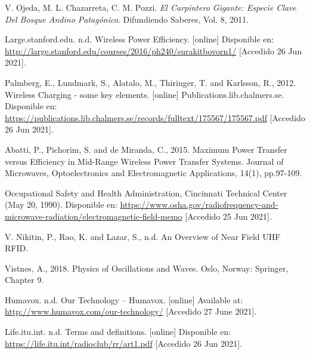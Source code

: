 %

%

\begin{flushleft}
\begin{thebibliography}{9}

V. Ojeda, M. L. Chazarreta, C. M. Pozzi. \textit{El Carpintero Gigante: Especie Clave Del Bosque Andino Patagónico}. Difundiendo Saberes, Vol. 8, 2011.

Large.stanford.edu. n.d. Wireless Power Efficiency. [online] Disponible en: \href{http://large.stanford.edu/courses/2016/ph240/surakitbovorn1/}{http://large.stanford.edu/courses/2016/ph240/surakitbovorn1/} [Accedido 26 Jun 2021].

Palmberg, E., Lundmark, S., Alatalo, M., Thiringer, T. and Karlsson, R., 2012. Wireless Charging - some key elements. [online] Publications.lib.chalmers.se. Disponible en: \href{https://publications.lib.chalmers.se/records/fulltext/175567/175567.pdf}{https://publications.lib.chalmers.se/records/fulltext/175567/175567.pdf} [Accedido 26 Jun 2021].

Abatti, P., Pichorim, S. and de Miranda, C., 2015. Maximum Power Transfer versus Efficiency in Mid-Range Wireless Power Transfer Systems. Journal of Microwaves, Optoelectronics and Electromagnetic Applications, 14(1), pp.97-109.

Occupational Safety and Health Administration, Cincinnati Technical Center (May 20, 1990).  Disponible en: \href{https://www.osha.gov/radiofrequency-and-microwave-radiation/electromagnetic-field-memo}{https://www.osha.gov/radiofrequency-and-microwave-radiation/electromagnetic-field-memo} [Accedido 25 Jun 2021].

V. Nikitin, P., Rao, K. and Lazar, S., n.d. An Overview of Near Field UHF RFID.

Vistnes, A., 2018. Physics of Oscillations and Waves. Oslo, Norway: Springer, Chapter 9.

Humavox. n.d. Our Technology – Humavox. [online] Available at: \href{http://www.humavox.com/our-technology/}{http://www.humavox.com/our-technology/} [Accedido 27 June 2021].

Life.itu.int. n.d. Terms and definitions. [online] Disponible en: \href{https://life.itu.int/radioclub/rr/art1.pdf}{https://life.itu.int/radioclub/rr/art1.pdf} [Accedido 26 Jun 2021].


\end{thebibliography}
\end{flushleft}
